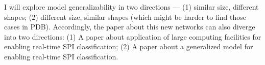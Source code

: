 {

    I will explore model generalizability in two directions — (1) similar size,
    different shapes;  (2) different size, similar shapes (which might be harder
    to find those cases in PDB).  Accordingly, the paper about this new networks
    can also diverge into two directions: (1) A paper about application of large
    computing facilities for enabling real-time SPI classification; (2) A paper
    about a generalized model for enabling real-time SPI classification.

}
